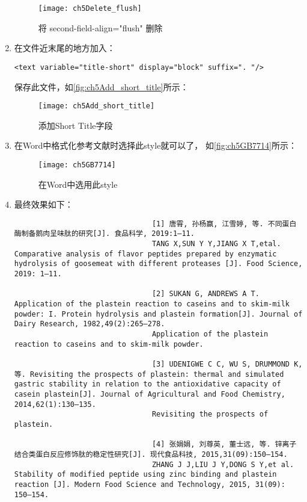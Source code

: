 \documentclass[cn,11pt,chinese]{elegantbook}
\begin{document}
\begin{enumerate}
							\begin{figure}[ht]
								\centering
								\texttt{[image: ch5Delete\_flush]}
								\caption{将 second-field-align="flush" 删除}
								\label{fig:ch5Delete_flush}
							\end{figure}
						\item 在文件近末尾的地方加入：
							\begin{lstlisting}[language=VBScript]
								<text variable="title-short" display="block" suffix=". "/>
							\end{lstlisting}
							保存此文件，如\autoref{fig:ch5Add_short_title}所示：
								\begin{figure}[ht]
									\centering
									\texttt{[image: ch5Add\_short\_title]}
									\caption{添加Short Title字段}
									\label{fig:ch5Add_short_title}
								\end{figure}
						\item 在Word中格式化参考文献时选择此style就可以了，
						如\autoref{fig:ch5GB7714}所示：
							\begin{figure}[ht]
								\centering
								\texttt{[image: ch5GB7714]}
								\caption{在Word中选用此style}
								\label{fig:ch5GB7714}
							\end{figure}
						\item 最终效果如下：
							\begin{lstlisting}
								[1] 唐霄, 孙杨赢, 江雪婷, 等. 不同蛋白酶制备鹅肉呈味肽的研究[J]. 食品科学, 2019:1–11. 
								TANG X,SUN Y Y,JIANG X T,etal. Comparative analysis of flavor peptides prepared by enzymatic hydrolysis of goosemeat with different proteases [J]. Food Science, 2019: 1–11.
								
								[2] SUKAN G, ANDREWS A T. Application of the plastein reaction to caseins and to skim-milk powder: I. Protein hydrolysis and plastein formation[J]. Journal of Dairy Research, 1982,49(2):265–278. 
								Application of the plastein reaction to caseins and to skim-milk powder.
								
								[3] UDENIGWE C C, WU S, DRUMMOND K, 等. Revisiting the prospects of plastein: thermal and simulated gastric stability in relation to the antioxidative capacity of casein plastein[J]. Journal of Agricultural and Food Chemistry, 2014,62(1):130–135. 
								Revisiting the prospects of plastein.
								
								[4] 张娟娟, 刘尊英, 董士远, 等. 锌离子结合类蛋白反应修饰肽的稳定性研究[J]. 现代食品科技, 2015,31(09):150–154. 
								ZHANG J J,LIU J Y,DONG S Y,et al. Stability of modified peptide using zinc binding and plastein reaction [J]. Modern Food Science and Technology, 2015, 31(09): 150–154.
								

\end{lstlisting}
\end{enumerate}
\end{document}
